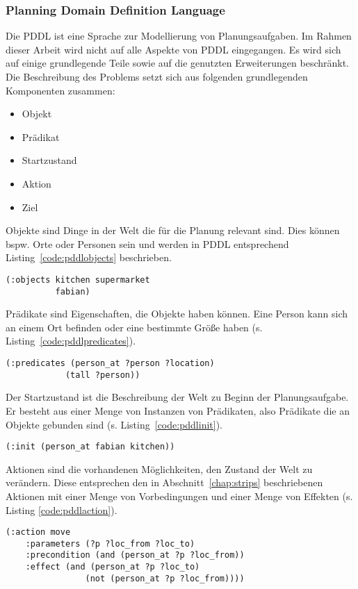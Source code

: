 \subsubsection{Planning Domain Definition Language}
Die \ac{PDDL} ist eine Sprache zur Modellierung von Planungsaufgaben.
Im Rahmen dieser Arbeit wird nicht auf alle Aspekte von \ac{PDDL} eingegangen.
Es wird sich auf einige grundlegende Teile sowie auf die genutzten Erweiterungen beschränkt.\\
Die Beschreibung des Problems setzt sich aus folgenden grundlegenden Komponenten zusammen:
\begin{itemize}
    \item Objekt
    \item Prädikat
    \item Startzustand
    \item Aktion
    \item Ziel
\end{itemize}
Objekte sind Dinge in der Welt die für die Planung relevant sind.
Dies können bspw. Orte oder Personen sein und werden in \ac{PDDL} entsprechend Listing~\ref{code:pddlobjects} beschrieben.
\begin{lstlisting}[caption={Objektbeschreibung in PDDL},language=pddl,label=code:pddlobjects]
(:objects kitchen supermarket
          fabian)
\end{lstlisting}
Prädikate sind Eigenschaften, die Objekte haben können.
Eine Person kann sich an einem Ort befinden oder eine bestimmte Größe haben (s. Listing~\ref{code:pddlpredicates}).
\begin{lstlisting}[caption={Prädikatbeschreibung in PDDL},language=pddl,label=code:pddlpredicates]
(:predicates (person_at ?person ?location)
            (tall ?person))
\end{lstlisting}
Der Startzustand ist die Beschreibung der Welt zu Beginn der Planungsaufgabe.
Er besteht aus einer Menge von Instanzen von Prädikaten, also Prädikate die an Objekte gebunden sind (s. Listing~\ref{code:pddlinit}).
\begin{lstlisting}[caption={Startzustand in PDDL},language=pddl,label=code:pddlinit]
(:init (person_at fabian kitchen))
\end{lstlisting}
Aktionen sind die vorhandenen Möglichkeiten, den Zustand der Welt zu verändern.
Diese entsprechen den in Abschnitt~\ref{chap:strips} beschriebenen Aktionen mit einer Menge von Vorbedingungen und einer Menge von Effekten (s. Listing \ref{code:pddlaction}).
\begin{lstlisting}[caption={Aktion um eine Person von einem Ort zum anderen zu bewegen in PDDL},language=pddl,label=code:pddlaction]
(:action move
    :parameters (?p ?loc_from ?loc_to)
    :precondition (and (person_at ?p ?loc_from))
    :effect (and (person_at ?p ?loc_to)
                (not (person_at ?p ?loc_from))))
\end{lstlisting}
